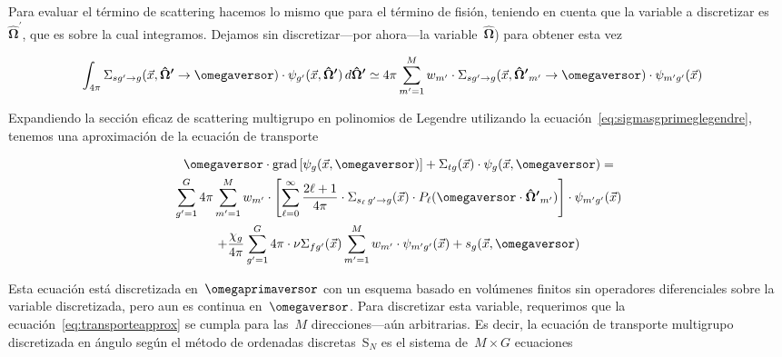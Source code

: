 Para evaluar el término de scattering hacemos lo mismo que para el término de fisión, teniendo en cuenta que la variable a discretizar es~$\boldsymbol{\hat{\Omega}^\prime}$, que es sobre la cual integramos. Dejamos sin discretizar---por ahora---la variable~$\boldsymbol{\hat{\Omega}}$) para obtener esta vez

\begin{align*}
\int_{4\pi} \Sigma_{sg^\prime \rightarrow g}(\vec{x}, \boldsymbol{\hat{\Omega}^\prime} \rightarrow \omegaversor) \cdot \psi_{g^\prime}(\vec{x}, \boldsymbol{\hat{\Omega}^\prime}) \, d\boldsymbol{\hat{\Omega}^\prime}
& \simeq 4\pi  \sum_{m^\prime=1}^M w_{m^\prime} \cdot \Sigma_{sg^\prime \rightarrow g}(\vec{x}, \boldsymbol{\hat{\Omega}^\prime}_{m^\prime} \rightarrow \omegaversor) \cdot \psi_{m^\prime g^\prime}(\vec{x})
\end{align*}

Expandiendo la sección eficaz de scattering multigrupo en polinomios de Legendre utilizando la ecuación~\eqref{eq:sigmasgprimeglegendre}, 
tenemos una aproximación de la ecuación de transporte

\begin{multline}
\label{eq:transporteapprox}
 \omegaversor \cdot \text{grad} \left[ \psi_g(\vec{x}, \omegaversor) \right]
 + \Sigma_{t g}(\vec{x}) \cdot \psi_g(\vec{x}, \omegaversor) = \\
 \sum_{g^\prime=1}^G 4\pi  \sum_{m^\prime=1}^M w_{m^\prime} \cdot 
\left[  \sum_{\ell=0}^\infty \frac{2\ell+1}{4\pi} \cdot \Sigma_{s_\ell \,g^\prime \rightarrow g}(\vec{x}) \cdot P_\ell (\omegaversor \cdot \boldsymbol{\hat{\Omega}^\prime}_{m^\prime}) \right]
\cdot \psi_{m^\prime g^\prime}(\vec{x}) 
 \\
+ \frac{\chi_g}{4\pi} \sum_{g^\prime=1}^G 4\pi \cdot \nu\Sigma_{fg^\prime}(\vec{x}) \sum_{m^\prime=1}^M w_{m^\prime} \cdot \psi_{m^\prime g^\prime}(\vec{x})
+ s_g(\vec{x}, \omegaversor)
\end{multline}

Esta ecuación está discretizada en~$\omegaprimaversor$ con un esquema basado en volúmenes finitos sin operadores diferenciales sobre la variable discretizada, pero aun es continua en~$\omegaversor$. Para discretizar esta variable, requerimos que la ecuación~\eqref{eq:transporteapprox} se cumpla para las~$M$ direcciones---aún arbitrarias. Es decir, la ecuación de transporte multigrupo discretizada en ángulo según el método de ordenadas discretas~S$_N$ es el sistema de~$M \times G$ ecuaciones


